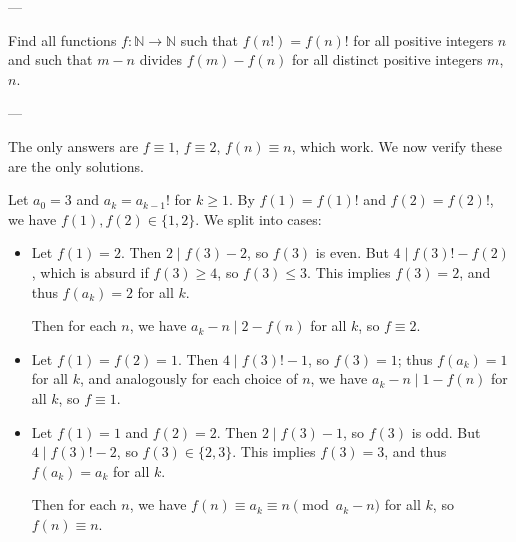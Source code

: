 
---

Find all functions $f:\mathbb N\to\mathbb N$ such that $f(n!)=f(n)!$ for all positive integers $n$ and such that $m-n$ divides $f(m)-f(n)$ for all distinct positive integers $m$, $n$.

---

The only answers are $f\equiv1$, $f\equiv2$, $f(n)\equiv n$, which work. We now verify these are the only solutions.

Let $a_0=3$ and $a_k=a_{k-1}!$ for $k\ge1$. By $f(1)=f(1)!$ and $f(2)=f(2)!$, we have $f(1),f(2)\in\{1,2\}$. We split into cases:
\begin{itemize}
    \item Let $f(1)=2$. Then $2\mid f(3)-2$, so $f(3)$ is even. But $4\mid f(3)!-f(2)$, which is absurd if $f(3)\ge4$, so $f(3)\le3$. This implies $f(3)=2$, and thus $f(a_k)=2$ for all $k$.

        Then for each $n$, we have $a_k-n\mid2-f(n)$ for all $k$, so $f\equiv2$.

    \item Let $f(1)=f(2)=1$. Then $4\mid f(3)!-1$, so $f(3)=1$; thus $f(a_k)=1$ for all $k$, and analogously for each choice of $n$, we have $a_k-n\mid1-f(n)$ for all $k$, so $f\equiv1$.

    \item Let $f(1)=1$ and $f(2)=2$. Then $2\mid f(3)-1$, so $f(3)$ is odd. But $4\mid f(3)!-2$, so $f(3)\in\{2,3\}$. This implies $f(3)=3$, and thus $f(a_k)=a_k$ for all $k$.

        Then for each $n$, we have $f(n)\equiv a_k\equiv n\pmod{a_k-n}$ for all $k$, so $f(n)\equiv n$.
\end{itemize}

